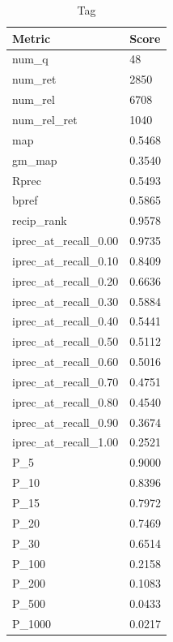 \begin{table}[htb]
{\begin{tabular}{ | l | l | }
    Metric & Score \\ \hline
	num\_q & 48 \\ \hline
	num\_ret & 2850 \\ \hline
	num\_rel & 6708 \\ \hline
	num\_rel\_ret & 1040 \\ \hline
	map & 0.5468 \\ \hline
	gm\_map & 0.3540 \\ \hline
	Rprec & 0.5493 \\ \hline
	bpref & 0.5865 \\ \hline
	recip\_rank & 0.9578 \\ \hline
	iprec\_at\_recall\_0.00 & 0.9735 \\ \hline
	iprec\_at\_recall\_0.10 & 0.8409 \\ \hline
	iprec\_at\_recall\_0.20 & 0.6636 \\ \hline
	iprec\_at\_recall\_0.30 & 0.5884 \\ \hline
	iprec\_at\_recall\_0.40 & 0.5441 \\ \hline
	iprec\_at\_recall\_0.50 & 0.5112 \\ \hline
	iprec\_at\_recall\_0.60 & 0.5016 \\ \hline
	iprec\_at\_recall\_0.70 & 0.4751 \\ \hline
	iprec\_at\_recall\_0.80 & 0.4540 \\ \hline
	iprec\_at\_recall\_0.90 & 0.3674 \\ \hline
	iprec\_at\_recall\_1.00 & 0.2521 \\ \hline
	P\_5 & 0.9000 \\ \hline
	P\_10 & 0.8396 \\ \hline
	P\_15 & 0.7972 \\ \hline
	P\_20 & 0.7469 \\ \hline
	P\_30 & 0.6514 \\ \hline
	P\_100 & 0.2158 \\ \hline
	P\_200 & 0.1083 \\ \hline
	P\_500 & 0.0433 \\ \hline
	P\_1000 & 0.0217 \\ \hline
    \end{tabular}
    \caption{Tag}
    \label{table:manual-tag}
    }
\end{table}


